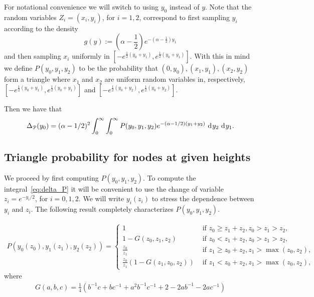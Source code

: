 For notational convenience we will switch to using $y_0$ instead of $y$. Note that the random variables $Z_i = (x_i,y_i)$, for $i = 1,2$, correspond to first sampling $y_i$ according to the density
\[
	g(y) := \left(\alpha -\frac{1}{2}\right) e^{-(\alpha-\frac{1}{2})y_1}
\] 
and then sampling $x_i$ uniformly in $[-e^{\frac{1}{2}(y_0+y_1)},e^{\frac{1}{2}(y_0+y_1)}]$. With this in mind we define $P(y_0,y_1,y_2)$ to be the probability that $(0,y_0), (x_1,y_1), (x_2,y_2)$ form a triangle where $x_1$ and $x_2$ are uniform random variables in, respectively, $[-e^{\frac{1}{2}(y_0+y_1)},e^{\frac{1}{2}(y_0+y_1)}]$ and  $[-e^{\frac{1}{2}(y_0+y_2)},e^{\frac{1}{2}(y_0+y_2)}]$.

Then we have that
\begin{align}\label{eq:delta_P}
 \Delta_{{\mathcal P}}(y_0) = (\alpha-1/2)^2 \int_0^\infty \int_0^\infty P(y_0, y_1, y_2) e^{-(\alpha-1/2)(y_1+y_2)} 
 \operatorname{\, \mathrm{d}\hspace{-1pt}} y_2 \operatorname{\, \mathrm{d}\hspace{-1pt}} y_1.
\end{align}

\subsection{Triangle probability for nodes at given heights}
We proceed by first computing $P(y_0,y_1,y_2)$. To compute the integral~\ref{eq:delta_P} it will be convenient to use the change of variable $z_i = e^{-y_i/2}$, for $i= 0, 1, 2$. We will write $y_i(z_i)$ to stress the dependence between $y_i$ and $z_i$. The following result completely characterizes $P(y_0,y_1,y_2)$.

\begin{lemma}\label{lem:triangle_prob_y_coordinates}
\begin{align*}
P(y_0(z_0),y_1(z_1),y_2(z_2)) = \begin{cases}
	1 &\text{ if } z_0 \geq z_1+z_2, z_0 > z_1 > z_2, \\
	1-G(z_0,z_1,z_2) &\text{ if } z_0 < z_1+z_2, z_0 > z_1 > z_2, \\
	\frac{z_0}{z_1} &\text{ if } z_1 \geq z_0+z_2, z_1 > \max(z_0,z_2), \\
	\frac{z_0}{z_1}\left(1-G(z_1,z_0,z_2)\right) &\text{ if } z_1 < z_0+z_2, z_1 > \max(z_0,z_2),
\end{cases}
\end{align*}
where 
\begin{align*}
G(a,b,c) = \frac{1}{4}
\left( b^{-1}c + bc^{-1} + a^2b^{-1}c^{-1} + 2 - 2ab^{-1}-2ac^{-1}\right)
\end{align*}
\end{lemma}


